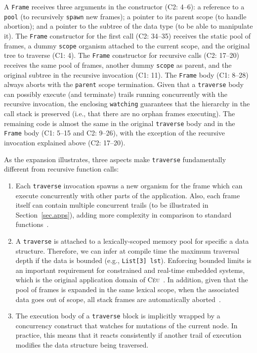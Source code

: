 \documentclass{sig-alternate}
\newcommand{\CEU}{\textsc{C\'{e}u}\xspace}
\newcommand{\code}[1] {{\small{\texttt{#1}}}}
\newcommand{\MM}[1] {\textcircled{\tiny{\textsf{#1}}}}
\begin{document}
A \code{Frame} receives three arguments in the constructor (\MM{C2}: 4--6):
a reference to a \code{pool} (to recursively \code{spawn} new frames);
a pointer to its parent scope (to handle abortion);
and a pointer to the subtree of the data type (to be able to manipulate it).
%
The \code{Frame} constructor for the first call (\MM{C2}: 34--35) receives the 
static pool of frames, a dummy \code{scope} organism attached to the current 
scope, and the original tree to traverse (\MM{C1}: 4).
%
The \code{Frame} constructor for recursive calls (\MM{C2}: 17--20) receives the 
same pool of frames, another dummy \code{scope} as parent, and the original 
subtree in the recursive invocation (\MM{C1}: 11).
%
The \code{Frame} body (\MM{C1}: 8--28) always aborts with the
\code{parent} scope termination.
Given that a \code{traverse} body can possibly execute (and terminate) trails 
running concurrently with the recursive invocation, the enclosing 
\code{watching} guarantees that the hierarchy in the call stack is preserved 
(i.e., that there are no orphan frames executing).
%
The remaining code is almost the same in the original \code{traverse} body and 
in the \code{Frame} body (\MM{C1}: 5--15 and \MM{C2}: 9--26), with the 
exception of the recursive invocation explained above (\MM{C2}: 17--20).

As the expansion illustrates, three aspects make \code{traverse} fundamentally 
different from recursive function calls:
%
\begin{enumerate}
\item Each \code{traverse} invocation spawns a new organism for the frame which 
can execute concurrently with other parts of the application.
Also, each frame itself can contain multiple concurrent trails (to be 
illustrated in Section~\ref{sec.apps}), adding more complexity in comparison to 
standard functions~\cite{ceu.mod15}.
%
\item A \code{traverse} is attached to a lexically-scoped memory pool for 
specific a data structure.
Therefore, we can infer at compile time the maximum traversal depth if the data 
is bounded (e.g., \code{List[3] lst}).
Enforcing bounded limits is an important requirement for constrained and 
real-time embedded systems, which is the original application domain of 
\CEU~\cite{ceu.sensys13}.
In addition, given that the pool of frames is expanded in the same lexical 
scope, when the associated data goes out of scope, all stack frames are 
automatically aborted~\cite{ceu.mod15}.
%
\item The execution body of a \code{traverse} block is implicitly wrapped by a 
concurrency construct that watches for mutations of the current node.
In practice, this means that it reacts consistently if another trail of 
execution modifies the data structure being traversed.
\end{enumerate}
\end{document}
